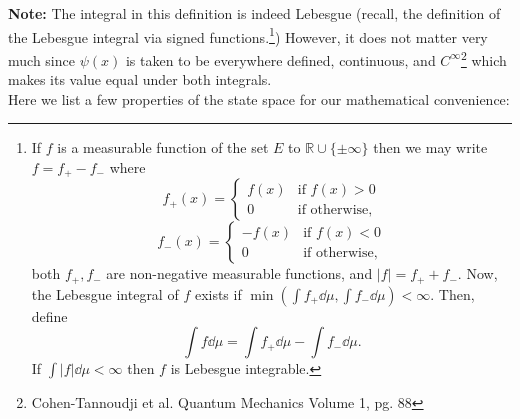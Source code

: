 \documentclass[10pt,a4paper]{report}
\newcommand{\R}{\mathbb{R}}
\begin{document}
\textbf{Note:} The integral in this definition is indeed Lebesgue (recall, the definition of the Lebesgue integral via signed functions.\footnote{If $f$ is a measurable function of the set $E$ to $\R \cup \{\pm \infty\}$ then we may write \(f = f_+ - f_-\) where \begin{equation*}
    f_+(x)=
        \begin{cases}
            f(x) & \text{if } f(x)>0\\
            0 & \text{if otherwise,} 
        \end{cases}
    \end{equation*}
    \begin{equation*}
        f_-(x)=
            \begin{cases}
                -f(x) & \text{if } f(x)<0\\
                0 & \text{if otherwise,} 
            \end{cases}
        \end{equation*}
both $f_+, f_-$ are non-negative measurable functions, and $|f| = f_+ + f_-$. Now, the Lebesgue integral of $f$ exists if $\min \left(\int f_+ \dd \mu, \int f_- \dd \mu\right) < \infty$. Then, define $$\int f \dd \mu = \int f_+ \dd \mu - \int f_- \dd \mu.$$ If $\int |f| \dd \mu < \infty$ then $f$ is Lebesgue integrable.}) However, it does not matter very much since $\psi(x)$ is taken to be everywhere defined, continuous, and $C^\infty$\footnote{Cohen-Tannoudji et al. Quantum Mechanics Volume 1, pg. 88} which makes its value equal under both integrals.\\

Here we list a few properties of the state space for our mathematical convenience:
\end{document}
